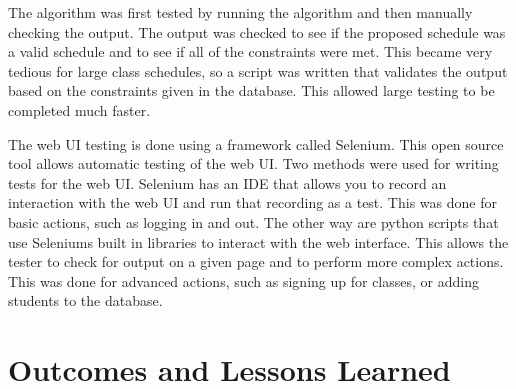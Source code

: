 \documentclass[12pt,article]{memoir}
\begin{document}
The algorithm was first tested by running the algorithm and then manually checking the output. The output was checked to see if the proposed schedule was a valid schedule and to see if all of the constraints were met. This became very tedious for large class schedules, so a script was written that validates the output based on the constraints given in the database. This allowed large testing to be completed much faster.

The web UI testing is done using a framework called Selenium. This open source tool allows automatic testing of the web UI. Two methods were used for writing tests for the web UI. Selenium has an IDE that allows you to record an interaction with the web UI and
run that recording as a test. This was done for basic actions, such as logging in and out. The other way are python scripts that use Seleniums built in libraries to interact with the web interface. This allows the tester to check for output on a given page and to
perform more complex actions. This was done for advanced actions, such as signing up for classes, or adding students to the database.
\chapter{Outcomes and Lessons Learned} %
\end{document}
